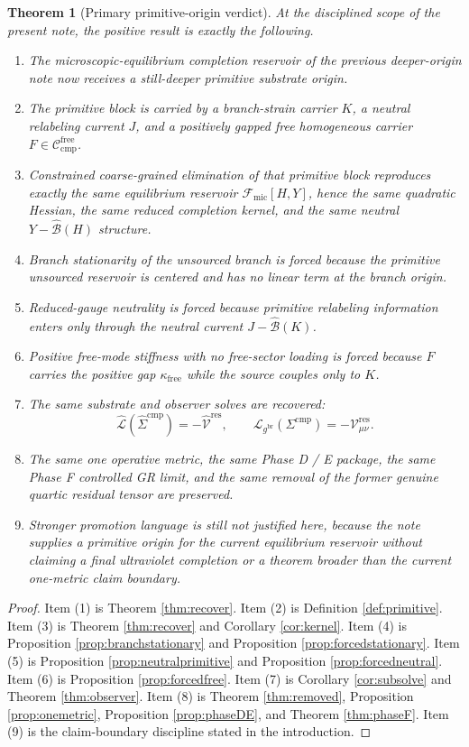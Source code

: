\documentclass[11pt]{article}
\newcommand{\ObserverMetric}{g^{\mathrm{br}}}
\newcommand{\CompShift}{\Sigma^{\mathrm{cmp}}}
\newcommand{\CompLift}{\widehat\Sigma^{\mathrm{cmp}}}
\newcommand{\ResidualCore}{\mathcal V_{\mu\nu}^{\mathrm{res}}}
\newcommand{\ResidualLift}{\widehat{\mathcal V}^{\mathrm{res}}}
\newcommand{\SubGaugeVec}{\widehat{\mathcal B}}
\newcommand{\SubReducedEin}{\widehat{\mathcal L}}
\newcommand{\GaugeAux}{Y}
\newcommand{\ReducedEin}{\mathcal L_{\ObserverMetric}}
\newcommand{\CompFree}{\mathscr C_{\mathrm{cmp}}^{\mathrm{free}}}
\newcommand{\MicFunctional}{\mathscr F_{\mathrm{mic}}}
\newcommand{\FreeStiff}{\kappa_{\mathrm{free}}}
\newcommand{\PrimStrain}{K}
\newcommand{\PrimNeutral}{J}
\newcommand{\PrimFree}{F}
\newtheorem{theorem}{Theorem}
\begin{document}
\begin{theorem}[Primary primitive-origin verdict]
\label{thm:verdict}
At the disciplined scope of the present note, the positive result is exactly the following.
\begin{enumerate}
    \item The microscopic-equilibrium completion reservoir of the previous deeper-origin note now receives a still-deeper primitive substrate origin.
    \item The primitive block is carried by a branch-strain carrier \(\PrimStrain\), a neutral relabeling current \(\PrimNeutral\), and a positively gapped free homogeneous carrier \(\PrimFree\in\CompFree\).
    \item Constrained coarse-grained elimination of that primitive block reproduces exactly the same equilibrium reservoir \(\MicFunctional[H,\GaugeAux]\), hence the same quadratic Hessian, the same reduced completion kernel, and the same neutral \( \GaugeAux-\SubGaugeVec(H)\) structure.
    \item Branch stationarity of the unsourced branch is forced because the primitive unsourced reservoir is centered and has no linear term at the branch origin.
    \item Reduced-gauge neutrality is forced because primitive relabeling information enters only through the neutral current \(\PrimNeutral-\SubGaugeVec(\PrimStrain)\).
    \item Positive free-mode stiffness with no free-sector loading is forced because \(\PrimFree\) carries the positive gap \(\FreeStiff\) while the source couples only to \(\PrimStrain\).
    \item The same substrate and observer solves are recovered:
    \[
    \SubReducedEin(\CompLift)=-\ResidualLift,
    \qquad
    \ReducedEin(\CompShift)=-\ResidualCore.
    \]
    \item The same one operative metric, the same Phase D / E package, the same Phase F controlled GR limit, and the same removal of the former genuine quartic residual tensor are preserved.
    \item Stronger promotion language is still not justified here, because the note supplies a primitive origin for the current equilibrium reservoir without claiming a final ultraviolet completion or a theorem broader than the current one-metric claim boundary.
\end{enumerate}
\end{theorem}

\begin{proof}
Item (1) is Theorem \ref{thm:recover}. Item (2) is Definition \ref{def:primitive}. Item (3) is Theorem \ref{thm:recover} and Corollary \ref{cor:kernel}. Item (4) is Proposition \ref{prop:branchstationary} and Proposition \ref{prop:forcedstationary}. Item (5) is Proposition \ref{prop:neutralprimitive} and Proposition \ref{prop:forcedneutral}. Item (6) is Proposition \ref{prop:forcedfree}. Item (7) is Corollary \ref{cor:subsolve} and Theorem \ref{thm:observer}. Item (8) is Theorem \ref{thm:removed}, Proposition \ref{prop:onemetric}, Proposition \ref{prop:phaseDE}, and Theorem \ref{thm:phaseF}. Item (9) is the claim-boundary discipline stated in the introduction.
\end{proof}
\end{document}
